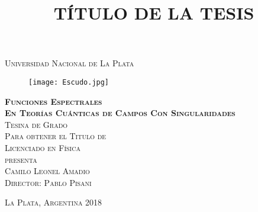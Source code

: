 \documentclass[11pt]{book}
\begin{document}









\title{TÍTULO DE LA TESIS} %

\begin{titlepage}
\begin{center}

\textsc{\Large Universidad Nacional de La Plata}\\[4em]

\begin{figure}[h]
\begin{center}
\texttt{[image: Escudo.jpg]}
\end{center}
\end{figure}

\vspace{1em}

\textsc{\huge \textbf{
Funciones Espectrales \\
En Teorías Cuánticas de Campos Con Singularidades
}}\\[4em]

\textsc{\large Tesina de Grado}\\[1em]

\textsc{Para obtener el Titulo de }\\[1em]

\textsc{Licenciado en Física}\\[1em]

\textsc{presenta}\\[1em]

\textsc{\Large Camilo Leonel Amadio}\\[1em]

\textsc{\large Director: Pablo Pisani}

\end{center}

\vspace*{\fill}
\textsc{La Plata, Argentina \hspace*{\fill} 2018}

\end{titlepage}
\end{document}
